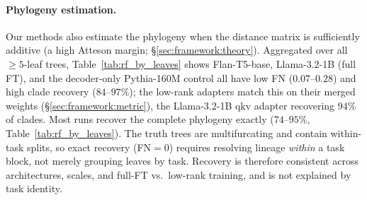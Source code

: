 \documentclass{article}
\theoremstyle{definition}
\theoremstyle{plain}
\begin{document}
\paragraph{Phylogeny estimation.}
\label{sec:results:weighttree}
Our methods also estimate the phylogeny when the distance matrix is sufficiently additive (a high
Atteson margin; \S\ref{sec:framework:theory}). Aggregated over all $\geq 5$-leaf trees,
Table~\ref{tab:rf_by_leaves} shows Flan-T5-base, Llama-3.2-1B (full FT), and the decoder-only
Pythia-160M control all have low FN ($0.07$--$0.28$) and high clade recovery ($84$--$97\%$); the
low-rank adapters match this on their merged weights (\S\ref{sec:framework:metric}), the Llama-3.2-1B
qkv adapter recovering $94\%$ of clades. Most runs recover the complete phylogeny exactly
($74$--$95\%$, Table~\ref{tab:rf_by_leaves}). The truth trees are multifurcating and contain
within-task splits, so exact recovery (FN$=0$) requires resolving lineage \emph{within} a task block,
not merely grouping leaves by task. Recovery is therefore consistent across architectures, scales, and
full-FT vs.\ low-rank training, and is not explained by task identity.
\end{document}
